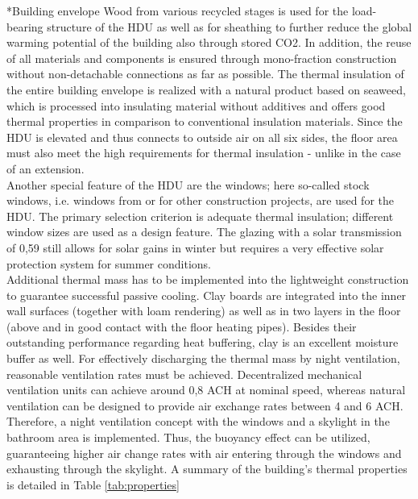 \documentclass[twocolumn, a4paper,10pt]{article}
\makeatletter
\renewcommand\subsection{\@startsection{subsection}{1}{\z@}{\z@}{\z@}{\normalfont\normalsize\bfseries}}
\renewcommand\subsection{\@startsection{subsection}{1}{\z@}{\z@}{0.1pt}{\normalfont\normalsize\bfseries}}
\makeatother
\begin{document}
\subsection*{Building envelope}
Wood from various recycled stages is used for the load-bearing structure of the HDU as well as for sheathing to further reduce the global warming potential of the building also through stored CO2. In addition, the reuse of all materials and components is ensured through mono-fraction construction without non-detachable connections as far as possible. The thermal insulation of the entire building envelope is realized with a natural product based on seaweed, which is processed into insulating material without additives and offers good thermal properties in comparison to conventional insulation materials. Since the HDU is elevated and thus connects to outside air on all six sides, the floor area must also meet the high requirements for thermal insulation - unlike in the case of an extension.\\
Another special feature of the HDU are the windows; here so-called stock windows, i.e. windows from or for other construction projects, are used for the HDU. The primary selection criterion is adequate thermal insulation; different window sizes are used as a design feature. The glazing with a solar transmission of 0,59 still allows for solar gains in winter but requires a very effective solar protection system for summer conditions. \\
Additional thermal mass has to be implemented into the lightweight construction to guarantee successful passive cooling. Clay boards are integrated into the inner wall surfaces (together with loam rendering) as well as in two layers in the floor (above and in good contact with the floor heating pipes). Besides their outstanding performance regarding heat buffering, clay is an excellent moisture buffer as well. For effectively discharging the thermal mass by night ventilation, reasonable ventilation rates must be achieved. Decentralized mechanical ventilation units can achieve around 0,8 ACH at nominal speed, whereas natural ventilation can be designed to provide air exchange rates between 4 and 6 ACH. Therefore, a night ventilation concept with the windows and a skylight in the bathroom area is implemented. Thus, the buoyancy effect can be utilized, guaranteeing higher air change rates with air entering through the windows and exhausting through the skylight. A summary of the building's thermal properties is detailed in Table \ref{tab:properties}\\
\end{document}

